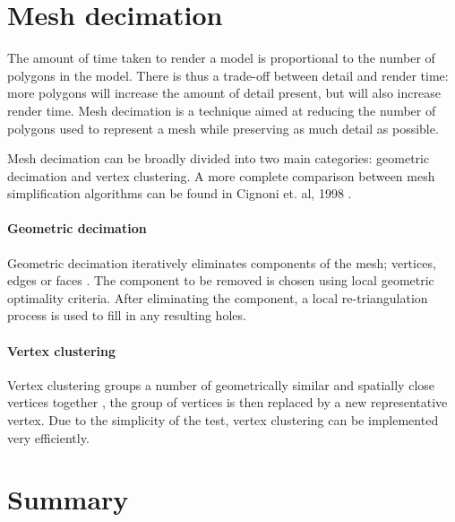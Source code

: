 

\section{Mesh decimation}
\label{sec:background_decimation}

The amount of time taken to render a model is proportional to the number of
polygons in the model.  There is thus a trade-off between detail and render
time: more polygons will increase the amount of detail present, but will also
increase render time.  Mesh decimation is a technique aimed at reducing the
number of polygons used to represent a mesh while preserving as much detail as
possible.

Mesh decimation can be broadly divided into two main categories: geometric
decimation and vertex clustering. A more complete comparison between mesh
simplification algorithms can be found in Cignoni et. al, 1998
\citet{cignoni98}.

\paragraph{Geometric decimation}

Geometric decimation iteratively eliminates components of the mesh; vertices,
edges or faces \citep{schroeder92}. The component to be removed is chosen using
local geometric optimality criteria. After eliminating the component, a local
re-triangulation process is used to fill in any resulting holes.


\paragraph{Vertex clustering}

Vertex clustering groups a number of geometrically similar and spatially close
vertices together \citep{rossignac93}, the group of vertices is then replaced
by a new representative vertex.  Due to the simplicity of the test, vertex
clustering can be implemented very efficiently.



\section{Summary}
\label{sec:background_end}

